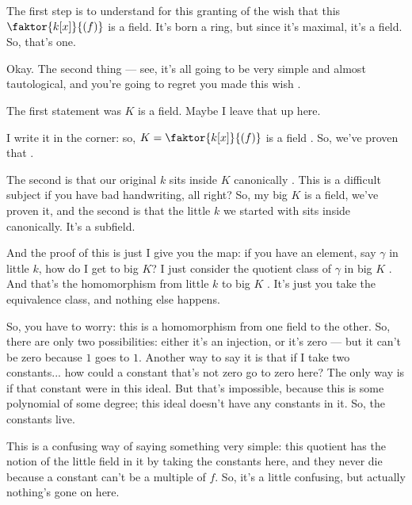 \begin{speech}[01:08:17 - 01:09:07]
The first step is to understand for this granting of the wish that this $\faktor{k[x]}{(f)}$ is a field. It's born a ring, but since it's maximal, it's a field. So, that's one.

Okay. The second thing --- see, it's all going to be very simple and almost tautological, and you're going to regret you made this wish .

The first statement was $K$ is a field. Maybe I leave that up here.
\end{speech}

\begin{hidden}
\end{hidden}

\begin{speech}[01:09:07 - 01:11:18]
I write it in the corner: so, $K = \faktor{k[x]}{(f)}$ is a field . So, we've proven that .

The second is that our original $k$ sits inside $K$ canonically . This is a difficult subject if you have bad handwriting, all right? So, my big $K$ is a field, we've proven it, and the second is that the little $k$ we started with sits inside canonically. It's a subfield.

And the proof of this is just I give you the map: if you have an element, say $\gamma$ in little $k$, how do I get to big $K$? I just consider the quotient class of $\gamma$ in big $K$ . And that's the homomorphism from little $k$ to big $K$ . It's just you take the equivalence class, and nothing else happens.

So, you have to worry: this is a homomorphism from one field to the other. So, there are only two possibilities: either it's an injection, or it's zero --- but it can't be zero because $1$ goes to $1$. Another way to say it is that if I take two constants... how could a constant that's not zero go to zero here? The only way is if that constant were in this ideal. But that's impossible, because this is some polynomial of some degree; this ideal doesn't have any constants in it. So, the constants live.

This is a confusing way of saying something very simple: this quotient has the notion of the little field in it by taking the constants here, and they never die because a constant can't be a multiple of $f$. So, it's a little confusing, but actually nothing's gone on here.
\end{speech}

